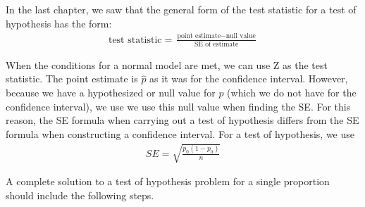 In the last chapter, we saw that the general form of the test statistic for a test of hypothesis has the form:
\begin{align*}
\text{test statistic} = \frac{\text{point estimate} - \text{null value}}{\text{SE of estimate}}
\end{align*}

When the conditions for a normal model are met, we can use Z as the test statistic.  The point estimate is $\hat{p}$ as it was for the confidence interval.  However, because we have a hypothesized or null value for $p$ (which we do not have for the confidence interval), we use we use this null value when finding the SE.  For this reason, the SE formula when carrying out a test of hypothesis differs from the SE formula when constructing a confidence interval.  For a test of hypothesis, we use
\begin{align*}
SE = \sqrt{\frac{p_0(1-p_0)}{n}}
\end{align*}

A complete solution to a test of hypothesis problem for a single proportion should include the following steps.

